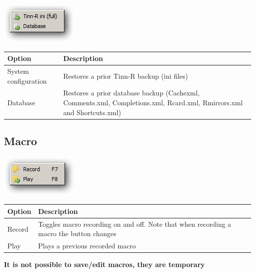 \includegraphics[scale=0.50]{./res/menu_tools_restore.png}\\

\begin{scriptsize}\begin{tabularx}{\textwidth}{>{\hsize=0.3\hsize}X>{\hsize=0.7\hsize}X}\\
    \hline
    \textbf{Option} & \textbf{Description} \\
    \hline
    System configuration & Restores a prior Tinn-R backup (ini files) \\
    Database & Restores a prior database backup (Cachexml, Comments.xml, Completions.xml, Rcard.xml, Rmirrors.xml and Shortcuts.xml) \\
    \hline
  \end{tabularx}\end{scriptsize}


\hypertarget{menu_tools_macro}{}
\subsection{Macro}

\includegraphics[scale=0.50]{./res/menu_tools_macro.png}\\

\begin{scriptsize}\begin{tabularx}{\textwidth}{>{\hsize=0.3\hsize}X>{\hsize=0.7\hsize}X}\\
    \hline
    \textbf{Option} & \textbf{Description} \\
    \hline
    Record & Toggles macro recording on and off. Note that when recording a macro the button changes \\
    Play & Plays a previous recorded macro \\
    \hline
  \end{tabularx}\end{scriptsize}

\textbf{It is not possible to save/edit macros, they are temporary}


